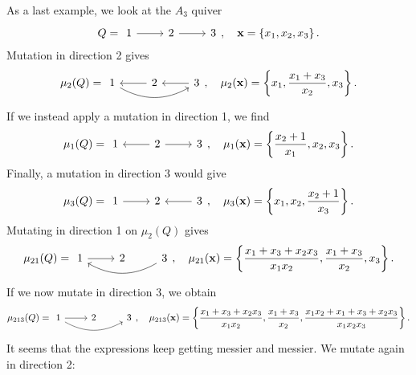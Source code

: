 \begin{example}
	As a last example, we look at the $A_3$ quiver
	\begin{equation*}
		Q =
		\begin{tikzcd}
			1 \rar[] & 2 \rar[] &3
		\end{tikzcd},
		\quad \bx = \left\{x_1, x_2, x_3\right\}.
	\end{equation*}
	Mutation in direction 2 gives
	\begin{equation*}
		\mu_2(Q) =
		\begin{tikzcd}
			1 \rar[leftarrow] \ar[rr, bend right] & 2 \rar[leftarrow]& 3
		\end{tikzcd},
		\quad \mu_2(\bx) = \left\{x_1, \frac{x_1 + x_3}{x_2}, x_3\right\}.
	\end{equation*}
	If we instead apply a mutation in direction 1, we find
	\begin{equation*}
		\mu_1(Q) =
		\begin{tikzcd}
			1 \rar[leftarrow] & 2 \rar[]& 3
		\end{tikzcd},
		\quad \mu_1(\bx) = \left\{\frac{x_2 + 1}{x_1}, x_2, x_3\right\}.
	\end{equation*}
	Finally, a mutation in direction 3 would give
	\begin{equation*}
		\mu_3(Q) =
		\begin{tikzcd}
			1 \rar[] & 2 \rar[leftarrow]& 3
		\end{tikzcd},
		\quad \mu_3(\bx) = \left\{x_1, x_2, \frac{x_2 + 1}{x_3}\right\}.
	\end{equation*}
	Mutating in direction 1 on $\mu_2(Q)$ gives
	\begin{equation*}
		\mu_{21}(Q) =
		\begin{tikzcd}
			1 \rar[] \ar[rr,leftarrow, bend right] & 2 & 3
		\end{tikzcd},
		\quad \mu_{21}(\bx) = \left\{\frac{x_1 + x_3 + x_2x_3}{x_1x_2}, \frac{x_1 + x_3}{x_2}, x_3\right\}.
	\end{equation*}
	If we now mutate in direction 3, we obtain
	\begin{equation*}
		\mu_{213}(Q) =
		\begin{tikzcd}
			1 \rar[] \ar[rr, bend right] & 2 & 3
		\end{tikzcd},
		\quad \mu_{213}(\bx) = \left\{\frac{x_1 + x_3 + x_2x_3}{x_1x_2}, \frac{x_1 + x_3}{x_2}, \frac{x_1 x_2 + x_1 + x_3 + x_2 x_3}{x_1x_2x_3}\right\}.
	\end{equation*}
	It seems that the expressions keep getting messier and messier. We mutate again in direction 2:

\end{example}
